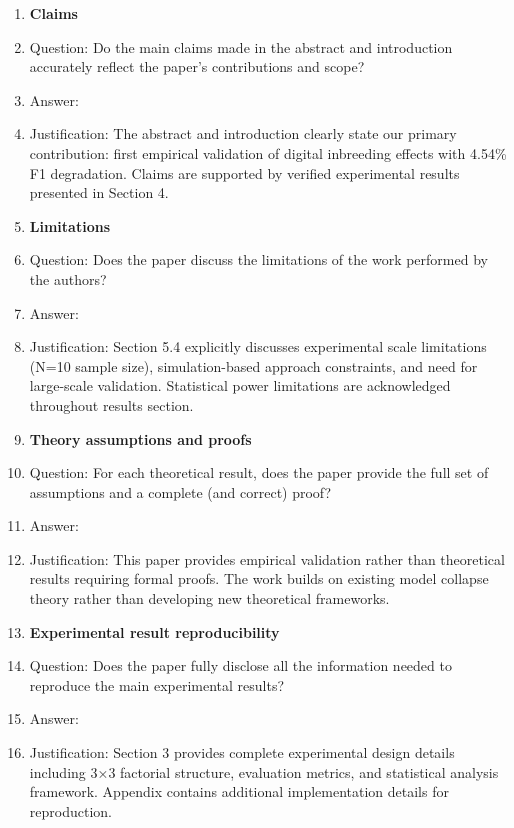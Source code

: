 \documentclass{article}
\begin{document}
\begin{enumerate}

\item {\bf Claims}
    \item[] Question: Do the main claims made in the abstract and introduction accurately reflect the paper's contributions and scope?
    \item[] Answer: \answerYes{}
    \item[] Justification: The abstract and introduction clearly state our primary contribution: first empirical validation of digital inbreeding effects with 4.54\% F1 degradation. Claims are supported by verified experimental results presented in Section 4.

\item {\bf Limitations}
    \item[] Question: Does the paper discuss the limitations of the work performed by the authors?
    \item[] Answer: \answerYes{}
    \item[] Justification: Section 5.4 explicitly discusses experimental scale limitations (N=10 sample size), simulation-based approach constraints, and need for large-scale validation. Statistical power limitations are acknowledged throughout results section.

\item {\bf Theory assumptions and proofs}
    \item[] Question: For each theoretical result, does the paper provide the full set of assumptions and a complete (and correct) proof?
    \item[] Answer: \answerNA{}
    \item[] Justification: This paper provides empirical validation rather than theoretical results requiring formal proofs. The work builds on existing model collapse theory rather than developing new theoretical frameworks.

\item {\bf Experimental result reproducibility}
    \item[] Question: Does the paper fully disclose all the information needed to reproduce the main experimental results?
    \item[] Answer: \answerYes{}
    \item[] Justification: Section 3 provides complete experimental design details including 3×3 factorial structure, evaluation metrics, and statistical analysis framework. Appendix contains additional implementation details for reproduction.


\end{enumerate}
\end{document}
